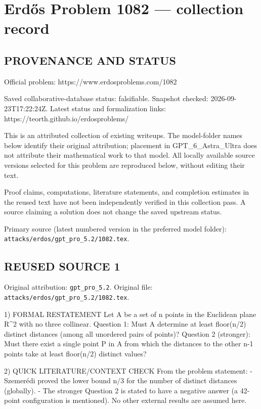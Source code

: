 \section*{Erd\H{o}s Problem 1082 --- collection record}

\subsection*{PROVENANCE AND STATUS}
Official problem: https://www.erdosproblems.com/1082

Saved collaborative-database status: falsifiable.
Snapshot checked: 2026-09-23T17:22:24Z.
Latest status and formalization links: https://teorth.github.io/erdosproblems/

This is an attributed collection of existing writeups. The model-folder names below identify their original attribution; placement in GPT\_6\_Astra\_Ultra does not attribute their mathematical work to that model. All locally available source versions selected for this problem are reproduced below, without editing their text.

Proof claims, computations, literature statements, and completion estimates in the reused text have not been independently verified in this collection pass. A source claiming a solution does not change the saved upstream status.

Primary source (latest numbered version in the preferred model folder): \texttt{attacks/erdos/gpt\_pro\_5.2/1082.tex}.

\subsection*{REUSED SOURCE 1}
Original attribution: \texttt{gpt\_pro\_5.2}.
Original file: \texttt{attacks/erdos/gpt\_pro\_5.2/1082.tex}.


1) FORMAL RESTATEMENT
Let A be a set of n points in the Euclidean plane R^2 with no three collinear.
Question 1: Must A determine at least floor(n/2) distinct distances (among all unordered pairs of points)?
Question 2 (stronger): Must there exist a single point P in A from which the distances to the other n-1 points take at least floor(n/2) distinct values?

2) QUICK LITERATURE/CONTEXT CHECK
From the problem statement:
- Szemerédi proved the lower bound n/3 for the number of distinct distances (globally).
- The stronger Question 2 is stated to have a negative answer (a 42-point configuration is mentioned).
No other external results are assumed here.

